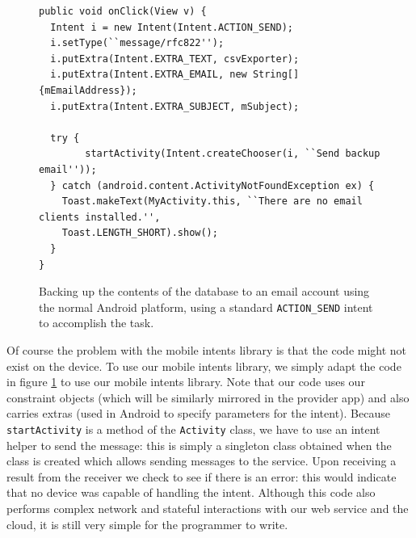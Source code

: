 \documentclass{acm_proc_article-sp}
\begin{document}
\begin{figure}
  \begin{lstlisting}
public void onClick(View v) {
  Intent i = new Intent(Intent.ACTION_SEND);
  i.setType(``message/rfc822'');
  i.putExtra(Intent.EXTRA_TEXT, csvExporter);
  i.putExtra(Intent.EXTRA_EMAIL, new String[]{mEmailAddress});
  i.putExtra(Intent.EXTRA_SUBJECT, mSubject);
      
  try {
        startActivity(Intent.createChooser(i, ``Send backup email''));
  } catch (android.content.ActivityNotFoundException ex) {
    Toast.makeText(MyActivity.this, ``There are no email clients installed.'',
    Toast.LENGTH_SHORT).show();
  }
}
  \end{lstlisting}
  \caption{Backing up the contents of the database to an email account
    using the normal Android platform, using a standard
    \texttt{ACTION\_SEND} intent to accomplish the task.}
  \label{fig:send-email-intent}

\end{figure}

Of course the problem with the mobile intents library is that the code
might not exist on the device.  To use our mobile intents library, we
simply adapt the code in figure \ref{fig:send-email-intent} to use our
mobile intents library.  Note that our code uses our constraint
objects (which will be similarly mirrored in the provider app) and
also carries extras (used in Android to specify parameters for the
intent).  Because \texttt{startActivity} is a method of the
\texttt{Activity} class, we have to use an intent helper to send the
message: this is simply a singleton class obtained when the class is
created which allows sending messages to the service.  Upon receiving
a result from the receiver we check to see if there is an error: this
would indicate that no device was capable of handling the intent.
Although this code also performs complex network and stateful
interactions with our web service and the cloud, it is still very
simple for the programmer to write.
\end{document}

